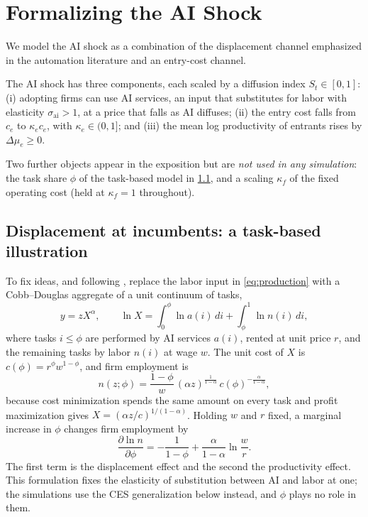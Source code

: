 \section{Formalizing the AI Shock}\label{sec:ai-model}


We model the AI shock as a combination of the displacement channel emphasized in the automation literature and an entry-cost channel.

\begin{assumption}[AI shock]\label{ass:ai-shock}
The AI shock has three components, each scaled by a diffusion index $S_t \in [0,1]$: (i) adopting firms can use AI services, an input that substitutes for labor with elasticity $\sigma_{\text{ai}} > 1$, at a price that falls as AI diffuses; (ii) the entry cost falls from $c_e$ to $\kappa_e c_e$, with $\kappa_e \in (0,1]$; and (iii) the mean log productivity of entrants rises by $\Delta\mu_e \ge 0$.
\end{assumption}

\noindent
Two further objects appear in the exposition but are \emph{not used in any simulation}: the task share $\phi$ of the task-based model in \cref{sec:ai-displacement}, and a scaling $\kappa_f$ of the fixed operating cost (held at $\kappa_f = 1$ throughout).

\subsection{Displacement at incumbents: a task-based illustration}\label{sec:ai-displacement}

To fix ideas, and following \citet{acemoglu2018race}, replace the labor input in \cref{eq:production} with a Cobb--Douglas aggregate of a unit continuum of tasks,
\begin{equation}\label{eq:tasks}
  y = z X^{\alpha}, \qquad \ln X = \int_0^{\phi} \ln a(i)\, di + \int_{\phi}^{1} \ln n(i)\, di,
\end{equation}
where tasks $i \le \phi$ are performed by AI services $a(i)$, rented at unit price $r$, and the remaining tasks by labor $n(i)$ at wage $w$.
The unit cost of $X$ is $c(\phi) = r^{\phi} w^{1-\phi}$, and firm employment is
\begin{equation}\label{eq:ai-labor-demand}
  n(z;\phi) = \frac{1-\phi}{w} \, (\alpha z)^{\frac{1}{1-\alpha}} \, c(\phi)^{-\frac{\alpha}{1-\alpha}} ,
\end{equation}
because cost minimization spends the same amount on every task and profit maximization gives $X = (\alpha z / c)^{1/(1-\alpha)}$.
Holding $w$ and $r$ fixed, a marginal increase in $\phi$ changes firm employment by
\begin{equation}\label{eq:displacement-condition}
  \frac{\partial \ln n}{\partial \phi} = -\frac{1}{1-\phi} + \frac{\alpha}{1-\alpha} \ln\frac{w}{r} .
\end{equation}
The first term is the displacement effect and the second the productivity effect.
This formulation fixes the elasticity of substitution between AI and labor at one; the simulations use the CES generalization below instead, and $\phi$ plays no role in them.


